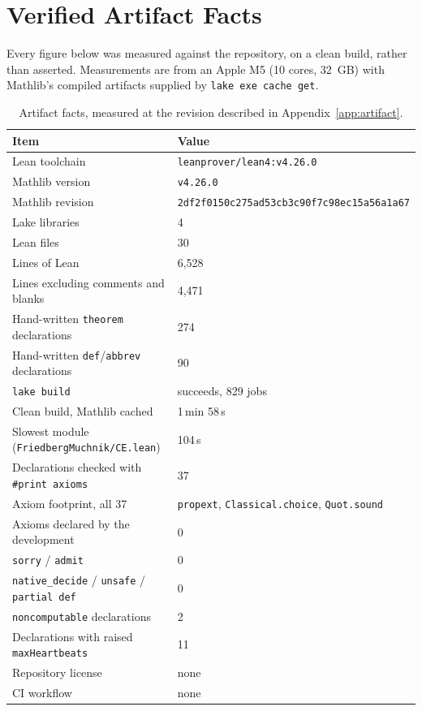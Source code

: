\section{Verified Artifact Facts}
\label{app:facts}

Every figure below was measured against the repository, on a clean build,
rather than asserted.  Measurements are from an Apple M5 (10 cores, 32~GB)
with Mathlib's compiled artifacts supplied by \texttt{lake exe cache get}.

\begin{table}[h]
\centering
\small
\begin{tabular}{ll}
\toprule
Item & Value \\
\midrule
Lean toolchain & \texttt{leanprover/lean4:v4.26.0} \\
Mathlib version & \texttt{v4.26.0} \\
Mathlib revision & \texttt{2df2f0150c275ad53cb3c90f7c98ec15a56a1a67} \\
Lake libraries & 4 \\
Lean files & 30 \\
Lines of Lean & 6{,}528 \\
Lines excluding comments and blanks & 4{,}471 \\
Hand-written \texttt{theorem} declarations & 274 \\
Hand-written \texttt{def}/\texttt{abbrev} declarations & 90 \\
\texttt{lake build} & succeeds, 829 jobs \\
Clean build, Mathlib cached & 1\,min 58\,s \\
Slowest module (\texttt{FriedbergMuchnik/CE.lean}) & 104\,s \\
Declarations checked with \texttt{\#print axioms} & 37 \\
Axiom footprint, all 37 & \texttt{propext}, \texttt{Classical.choice}, \texttt{Quot.sound} \\
Axioms declared by the development & 0 \\
\texttt{sorry} / \texttt{admit} & 0 \\
\texttt{native\_decide} / \texttt{unsafe} / \texttt{partial def} & 0 \\
\texttt{noncomputable} declarations & 2 \\
Declarations with raised \texttt{maxHeartbeats} & 11 \\
Repository license & none \\
CI workflow & none \\
\bottomrule
\end{tabular}
\caption{Artifact facts, measured at the revision described in
Appendix~\ref{app:artifact}.}
\end{table}

